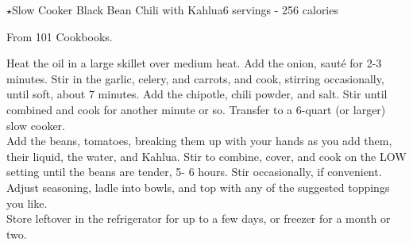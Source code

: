 \begin{recipe}{\texorpdfstring{$\star$}{str}Slow Cooker Black Bean Chili with Kahlua}{6 servings - 256 calories}{}

\freeform From 101 Cookbooks.


Heat the oil in a large skillet over medium heat. Add the onion, sauté for 2-3 minutes. Stir in the garlic, celery, and carrots, and cook, stirring occasionally, until soft, about 7 minutes. Add the chipotle, chili powder, and salt. Stir until combined and cook for another minute or so. Transfer to a 6-quart (or larger) slow cooker.\\

Add the beans, tomatoes, breaking them up with your hands as you add them, their liquid, the water, and Kahlua. Stir to combine, cover, and cook on the LOW setting until the beans are tender, 5- 6 hours. Stir occasionally, if convenient. Adjust seasoning, ladle into bowls, and top with any of the suggested toppings you like.\\

Store leftover in the refrigerator for up to a few days, or freezer for a month or two.

\end{recipe}